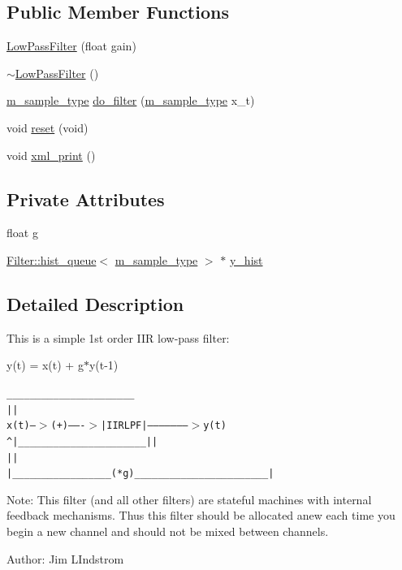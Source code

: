 \subsection*{Public Member Functions}
\begin{CompactItemize}
\item 
\hyperlink{classLowPassFilter_a0}{Low\-Pass\-Filter} (float gain)
\item 
\hyperlink{classLowPassFilter_a1}{$\sim$Low\-Pass\-Filter} ()
\item 
\hyperlink{Types_8h_a0}{m\_\-sample\_\-type} \hyperlink{classLowPassFilter_a2}{do\_\-filter} (\hyperlink{Types_8h_a0}{m\_\-sample\_\-type} x\_\-t)
\item 
void \hyperlink{classLowPassFilter_a3}{reset} (void)
\item 
void \hyperlink{classLowPassFilter_a4}{xml\_\-print} ()
\end{CompactItemize}
\subsection*{Private Attributes}
\begin{CompactItemize}
\item 
float \hyperlink{classLowPassFilter_r0}{g}
\item 
\hyperlink{classFilter_1_1hist__queue}{Filter::hist\_\-queue}$<$ \hyperlink{Types_8h_a0}{m\_\-sample\_\-type} $>$ $\ast$ \hyperlink{classLowPassFilter_r1}{y\_\-hist}
\end{CompactItemize}


\subsection{Detailed Description}
This is a simple 1st order IIR low-pass filter:

y(t) = x(t) + g$\ast$y(t-1) \small\begin{alltt}
                       \_\_\_\_\_\_\_\_\_\_\_\_\_\_\_\_\_\_\_\_\_\_
                      |                      |
  x(t) ---$>$(+)-------$>$|        IIR LPF       |--------------------$>$ y(t)
            ^         |\_\_\_\_\_\_\_\_\_\_\_\_\_\_\_\_\_\_\_\_\_\_|           |
            |                                            |
            |\_\_\_\_\_\_\_\_\_\_\_\_\_\_\_\_\_(*g)\_\_\_\_\_\_\_\_\_\_\_\_\_\_\_\_\_\_\_\_\_\_\_|
 \end{alltt}\normalsize 


\begin{Desc}
\item[Note:]This filter (and all other filters) are stateful machines with internal feedback mechanisms. Thus this filter should be allocated anew each time you begin a new channel and should not be mixed between channels.\end{Desc}
\begin{Desc}
\item[Author:]Jim LIndstrom \end{Desc}




